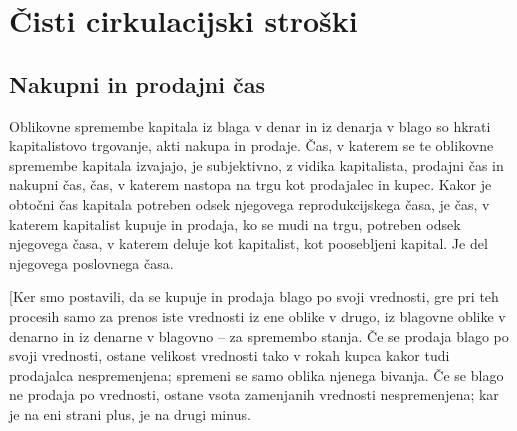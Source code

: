 \documentclass[kapital_02.tex]{subfiles}
\begin{document}
\section{Čisti cirkulacijski stroški}

\subsection{Nakupni in prodajni čas}

Oblikovne \KPEstran spremembe kapitala iz blaga v denar in iz denarja v blago so hkrati kapitalistovo trgovanje, akti nakupa in prodaje.
Čas, v katerem se te oblikovne spremembe kapitala izvajajo, je subjektivno, z vidika kapitalista, prodajni čas in nakupni čas, čas, v katerem nastopa na trgu kot prodajalec in kupec.
Kakor je obtočni čas kapitala potreben odsek njegovega reprodukcijskega časa, je čas, v katerem kapitalist kupuje in prodaja, ko se mudi na trgu, potreben odsek njegovega časa, v katerem deluje kot kapitalist, kot poosebljeni kapital. 
Je del njegovega poslovnega časa.

[Ker smo postavili, da se kupuje in prodaja blago po svoji vrednosti, gre pri teh procesih samo za prenos iste vrednosti iz ene oblike v drugo, iz blagovne oblike v denarno in iz denarne v blagovno -- za spremembo stanja.
Če se prodaja blago po svoji vrednosti, ostane velikost vrednosti tako v rokah kupca kakor tudi prodajalca nespremenjena; spremeni se samo oblika njenega bivanja.
Če se blago ne prodaja po vrednosti, ostane vsota zamenjanih vrednosti nespremenjena; kar je na eni strani plus, je na drugi minus.
\end{document}
